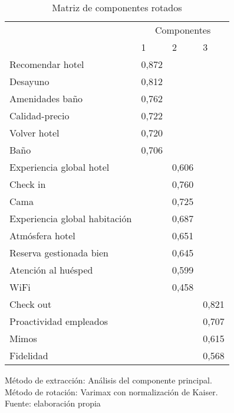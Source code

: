 \begin{table}[h]
    \caption {Matriz de componentes rotados}
	\label{tab:componentes1}
	\setlength\extrarowheight{5pt}
	
	\begin{tabular}{p{7.0cm} p{2.3cm} p{2.3cm} p{1.5cm}}
	\toprule
		& \multicolumn{3}{c}{Componentes} \\
		& 1	& 2	& 3	\\
	\midrule
	Recomendar hotel & 0,872 &  & \\
	Desayuno & 0,812 &  & \\
	Amenidades baño & 0,762 &  & \\
	Calidad-precio & 0,722 &  & \\
	Volver hotel & 0,720 &  & \\
	Baño & 0,706 &  & \\
	Experiencia global hotel &  & 0,606 & \\
	Check in &  & 0,760 & \\
	Cama &  & 0,725 & \\
	Experiencia global habitación &  & 0,687 & \\
	Atmósfera hotel &  & 0,651 & \\
	Reserva gestionada bien &  & 0,645 & \\
	Atención al huésped &  & 0,599 & \\
	WiFi	&	& 0,458	&	\\
	Check out &  &  & 0,821 \\
	Proactividad empleados &  &  & 0,707 \\
	Mimos	&	&	&	0,615 \\
	Fidelidad	&	&	& 0,568 \\
	\bottomrule
	\end{tabular}
	
	\center
	\footnotesize
	Método de extracción: Análisis del componente principal.\\
	Método de rotación: Varimax con normalización de Kaiser.\\
	Fuente: elaboración propia
\end{table}
